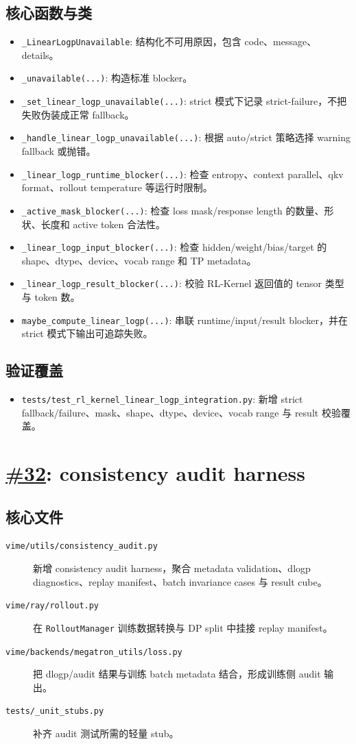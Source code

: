 \documentclass[11pt,a4paper]{ctexart}
\newcommand{\code}[1]{{\small\nolinkurl{#1}}}
\newcommand{\pr}[1]{\href{https://github.com/RL-Align/vime/pull/#1}{\##1}}
\newcommand{\fileitem}[2]{\item[\code{#1}] #2}
\begin{document}
\subsection{核心函数与类}
\begin{itemize}
  \item \code{_LinearLogpUnavailable}: 结构化不可用原因，包含 code、message、details。
  \item \code{_unavailable(...)}: 构造标准 blocker。
  \item \code{_set_linear_logp_unavailable(...)}: strict 模式下记录 strict-failure，不把失败伪装成正常 fallback。
  \item \code{_handle_linear_logp_unavailable(...)}: 根据 auto/strict 策略选择 warning fallback 或抛错。
  \item \code{_linear_logp_runtime_blocker(...)}: 检查 entropy、context parallel、qkv format、rollout temperature 等运行时限制。
  \item \code{_active_mask_blocker(...)}: 检查 loss mask/response length 的数量、形状、长度和 active token 合法性。
  \item \code{_linear_logp_input_blocker(...)}: 检查 hidden/weight/bias/target 的 shape、dtype、device、vocab range 和 TP metadata。
  \item \code{_linear_logp_result_blocker(...)}: 校验 RL-Kernel 返回值的 tensor 类型与 token 数。
  \item \code{maybe_compute_linear_logp(...)}: 串联 runtime/input/result blocker，并在 strict 模式下输出可追踪失败。
\end{itemize}

\subsection{验证覆盖}
\begin{itemize}
  \item \code{tests/test_rl_kernel_linear_logp_integration.py}: 新增 strict fallback/failure、mask、shape、dtype、device、vocab range 与 result 校验覆盖。
\end{itemize}

\section{\pr{32}: consistency audit harness}

\subsection{核心文件}
\begin{description}
  \fileitem{vime/utils/consistency_audit.py}{新增 consistency audit harness，聚合 metadata validation、dlogp diagnostics、replay manifest、batch invariance cases 与 result cube。}
  \fileitem{vime/ray/rollout.py}{在 \code{RolloutManager} 训练数据转换与 DP split 中挂接 replay manifest。}
  \fileitem{vime/backends/megatron_utils/loss.py}{把 dlogp/audit 结果与训练 batch metadata 结合，形成训练侧 audit 输出。}
  \fileitem{tests/_unit_stubs.py}{补齐 audit 测试所需的轻量 stub。}
\end{description}
\end{document}
